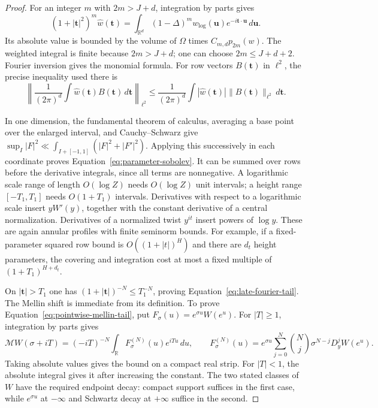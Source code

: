 \documentclass[11pt,a4paper]{article}
\numberwithin{equation}{section}
\numberwithin{figure}{section}
\theoremstyle{definition}
\theoremstyle{remark}
\begin{document}
\begin{proof}
For an integer $m$ with $2m>J+d$, integration by parts gives
\[
 (1+|\boldsymbol t|^2)^m\widehat w(\boldsymbol t)
 =\int_{\mathbb R^d}(1-\Delta)^m w_{\log}(\boldsymbol u)
                       e^{-i\boldsymbol t\cdot\boldsymbol u}\,d\boldsymbol u.
\]
Its absolute value is bounded by the volume of $\Omega$ times
$C_{m,d}p_{2m}(w)$.  The weighted integral is finite because $2m>J+d$;
one can choose $2m\le J+d+2$.  Fourier inversion gives the monomial formula.
For row vectors $B(\boldsymbol t)$ in $\ell^2$, the precise inequality used
there is
\[
 \left\|\frac1{(2\pi)^d}\int\widehat w(\boldsymbol t)
                 B(\boldsymbol t)\,d\boldsymbol t\right\|_{\ell^2}
 \le\frac1{(2\pi)^d}\int|\widehat w(\boldsymbol t)|
                 \|B(\boldsymbol t)\|_{\ell^2}\,d\boldsymbol t.
\]

In one dimension, the fundamental theorem of calculus, averaging a base
point over the enlarged interval, and Cauchy--Schwarz give
$\sup_I|F|^2\ll\int_{I+[-1,1]}(|F|^2+|F'|^2)$.  Applying this successively
in each coordinate proves Equation~\eqref{eq:parameter-sobolev}.  It can be
summed over rows before the derivative integrals, since all terms are
nonnegative.  A logarithmic scale range of length $O(\log Z)$ needs
$O(\log Z)$ unit intervals; a height range $[-T_1,T_1]$ needs
$O(1+T_1)$ intervals.  Derivatives with respect to a logarithmic scale insert
$yW'(y)$, together with the constant derivative of a central normalization.
Derivatives of a normalized twist $y^{it}$ insert powers of $\log y$.
These are again annular profiles with finite seminorm bounds.  For example,
if a fixed-parameter squared row bound is $O((1+|t|)^H)$ and there are
$d_t$ height parameters, the covering and integration cost at most a fixed
multiple of $(1+T_1)^{H+d_t}$.

On $|\boldsymbol t|>T_1$ one has
$(1+|\boldsymbol t|)^{-N}\le T_1^{-N}$, proving
Equation~\eqref{eq:late-fourier-tail}.  The Mellin shift is immediate from
its definition.  To prove Equation~\eqref{eq:pointwise-mellin-tail}, put
$F_\sigma(u)=e^{\sigma u}W(e^u)$.  For $|T|\ge1$, integration by parts gives
\[
 \mathcal MW(\sigma+iT)=(-iT)^{-N}
              \int_{\mathbb R}F_\sigma^{(N)}(u)e^{iTu}\,du,
 \qquad
 F_\sigma^{(N)}(u)=e^{\sigma u}\sum_{j=0}^N
       \binom Nj\sigma^{N-j}D_y^jW(e^u).
\]
Taking absolute values gives the bound on a compact real strip.  For
$|T|<1$, the absolute integral gives it after increasing the constant.
The two stated classes of $W$ have the required endpoint decay: compact
support suffices in the first case, while $e^{\sigma u}$ at $-\infty$ and
Schwartz decay at $+\infty$ suffice in the second.


\end{proof}
\end{document}
